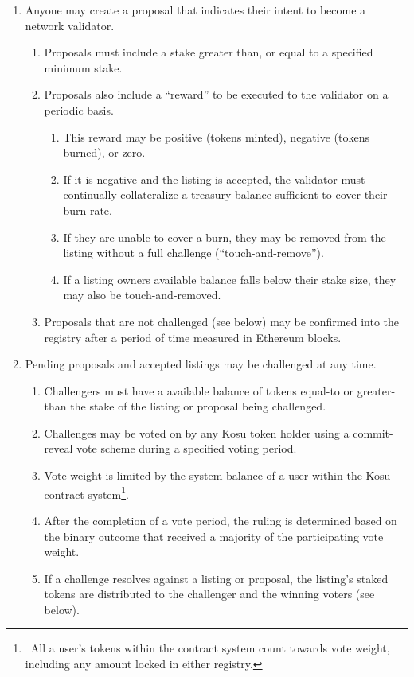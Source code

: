 \documentclass[10pt]{article}
\begin{document}
\begin{enumerate}
  \item Anyone may create a proposal that indicates their intent to become a network validator.
  \begin{enumerate}
    \item Proposals must include a stake greater than, or equal to a specified minimum stake.
    \item Proposals also include a ``reward'' to be executed to the validator on a periodic basis.
    \begin{enumerate}
      \item This reward may be positive (tokens minted), negative (tokens burned), or zero.
      \item If it is negative and the listing is accepted, the validator must continually collateralize a treasury balance sufficient to cover their burn rate.
      \item If they are unable to cover a burn, they may be removed from the listing without a full challenge (``touch-and-remove'').
      \item If a listing owners available balance falls below their stake size, they may also be touch-and-removed. 
    \end{enumerate}
    \item Proposals that are not challenged (see below) may be confirmed into the registry after a period of time measured in Ethereum blocks.
  \end{enumerate}
  \item Pending proposals and accepted listings may be challenged at any time.
  \begin{enumerate}
    \item Challengers must have a available balance of tokens equal-to or greater-than the stake of the listing or proposal being challenged. 
    \item Challenges may be voted on by any Kosu token holder using a commit-reveal vote scheme during a specified voting period.
    \item Vote weight is limited by the system balance of a user within the Kosu contract system\footnote{\ All a user's tokens within the contract system count towards vote weight, including any amount locked in either registry.}.
    \item After the completion of a vote period, the ruling is determined based on the binary outcome that received a majority of the participating vote weight.
    \item If a challenge resolves against a listing or proposal, the listing's staked tokens are distributed to the challenger and the winning voters (see below).
    

\end{enumerate}
\end{enumerate}
\end{document}
